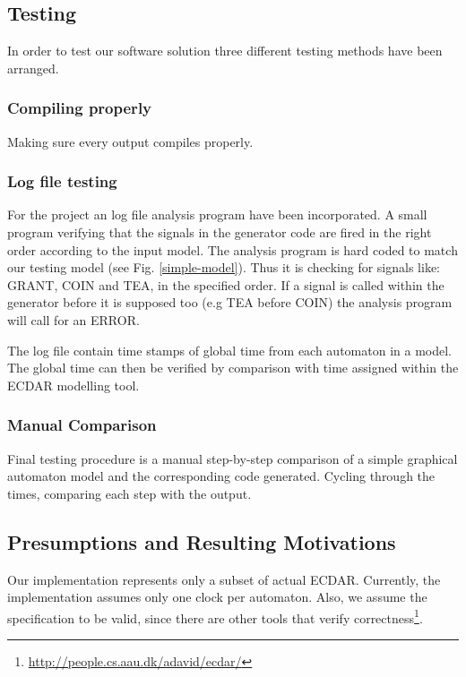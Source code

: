 \subsection{Testing}
\label{Testing}
In order to test our software solution three different testing methods have been
arranged.

\subsubsection{Compiling properly}
Making sure every output compiles properly.

\subsubsection{Log file testing}
For the project an log file analysis program have been incorporated. A small
program verifying that the signals in the generator code are fired in the right
order according to the input model.  The analysis program is hard coded to match
our testing model (see Fig. \ref{simple-model}). Thus it is checking for signals
like: GRANT, COIN and TEA, in the specified order. If a signal is called within
the generator before it is supposed too (e.g TEA before COIN) the analysis
program will call for an ERROR.

The log file contain time stamps of global time from each automaton in a model. The
global time can then be verified by comparison with time assigned within the
ECDAR modelling tool.

\subsubsection{Manual Comparison}
Final testing procedure is a manual step-by-step comparison of a simple
graphical automaton model and the corresponding code generated. Cycling through
the times, comparing each step with the output.

\subsection{Presumptions and Resulting Motivations}
\label{implementation-presumptions}

Our implementation represents only a subset of actual ECDAR. Currently, the
implementation assumes only one clock per automaton. Also, we assume the
specification to be valid, since there are other tools that verify
correctness\footnote{\url{http://people.cs.aau.dk/adavid/ecdar/}}.

